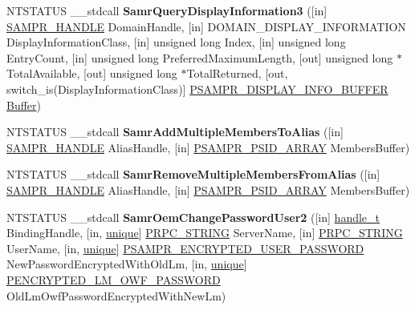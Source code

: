 \begin{DoxyCompactItemize}
N\+T\+S\+T\+A\+T\+US \+\_\+\+\_\+stdcall {\bfseries Samr\+Query\+Display\+Information3} (\mbox{[}in\mbox{]} \hyperlink{interfacevoid}{S\+A\+M\+P\+R\+\_\+\+H\+A\+N\+D\+LE} Domain\+Handle, \mbox{[}in\mbox{]} D\+O\+M\+A\+I\+N\+\_\+\+D\+I\+S\+P\+L\+A\+Y\+\_\+\+I\+N\+F\+O\+R\+M\+A\+T\+I\+ON Display\+Information\+Class, \mbox{[}in\mbox{]} unsigned long Index, \mbox{[}in\mbox{]} unsigned long Entry\+Count, \mbox{[}in\mbox{]} unsigned long Preferred\+Maximum\+Length, \mbox{[}out\mbox{]} unsigned long $\ast$Total\+Available, \mbox{[}out\mbox{]} unsigned long $\ast$Total\+Returned, \mbox{[}out, switch\+\_\+is(Display\+Information\+Class)\mbox{]} \hyperlink{union___s_a_m_p_r___d_i_s_p_l_a_y___i_n_f_o___b_u_f_f_e_r}{P\+S\+A\+M\+P\+R\+\_\+\+D\+I\+S\+P\+L\+A\+Y\+\_\+\+I\+N\+F\+O\+\_\+\+B\+U\+F\+F\+ER} \hyperlink{class_buffer}{Buffer})
\item 
\mbox{\label{interfacesamr_a555a21821898d740ad1dc7c13ff90698}} 
N\+T\+S\+T\+A\+T\+US \+\_\+\+\_\+stdcall {\bfseries Samr\+Add\+Multiple\+Members\+To\+Alias} (\mbox{[}in\mbox{]} \hyperlink{interfacevoid}{S\+A\+M\+P\+R\+\_\+\+H\+A\+N\+D\+LE} Alias\+Handle, \mbox{[}in\mbox{]} \hyperlink{struct___s_a_m_p_r___p_s_i_d___a_r_r_a_y}{P\+S\+A\+M\+P\+R\+\_\+\+P\+S\+I\+D\+\_\+\+A\+R\+R\+AY} Members\+Buffer)
\item 
\mbox{\label{interfacesamr_af6ec5850d2d1304fa99e938ed275da8a}} 
N\+T\+S\+T\+A\+T\+US \+\_\+\+\_\+stdcall {\bfseries Samr\+Remove\+Multiple\+Members\+From\+Alias} (\mbox{[}in\mbox{]} \hyperlink{interfacevoid}{S\+A\+M\+P\+R\+\_\+\+H\+A\+N\+D\+LE} Alias\+Handle, \mbox{[}in\mbox{]} \hyperlink{struct___s_a_m_p_r___p_s_i_d___a_r_r_a_y}{P\+S\+A\+M\+P\+R\+\_\+\+P\+S\+I\+D\+\_\+\+A\+R\+R\+AY} Members\+Buffer)
\item 
\mbox{\label{interfacesamr_aa6c8e116d1e1e63c6598500282f7785c}} 
N\+T\+S\+T\+A\+T\+US \+\_\+\+\_\+stdcall {\bfseries Samr\+Oem\+Change\+Password\+User2} (\mbox{[}in\mbox{]} \hyperlink{interfacevoid}{handle\+\_\+t} Binding\+Handle, \mbox{[}in, \hyperlink{interfaceunique}{unique}\mbox{]} \hyperlink{struct___r_p_c___s_t_r_i_n_g}{P\+R\+P\+C\+\_\+\+S\+T\+R\+I\+NG} Server\+Name, \mbox{[}in\mbox{]} \hyperlink{struct___r_p_c___s_t_r_i_n_g}{P\+R\+P\+C\+\_\+\+S\+T\+R\+I\+NG} User\+Name, \mbox{[}in, \hyperlink{interfaceunique}{unique}\mbox{]} \hyperlink{struct___s_a_m_p_r___e_n_c_r_y_p_t_e_d___u_s_e_r___p_a_s_s_w_o_r_d}{P\+S\+A\+M\+P\+R\+\_\+\+E\+N\+C\+R\+Y\+P\+T\+E\+D\+\_\+\+U\+S\+E\+R\+\_\+\+P\+A\+S\+S\+W\+O\+RD} New\+Password\+Encrypted\+With\+Old\+Lm, \mbox{[}in, \hyperlink{interfaceunique}{unique}\mbox{]} \hyperlink{struct___e_n_c_r_y_p_t_e_d___l_m___o_w_f___p_a_s_s_w_o_r_d}{P\+E\+N\+C\+R\+Y\+P\+T\+E\+D\+\_\+\+L\+M\+\_\+\+O\+W\+F\+\_\+\+P\+A\+S\+S\+W\+O\+RD} Old\+Lm\+Owf\+Password\+Encrypted\+With\+New\+Lm)

\end{DoxyCompactItemize}
